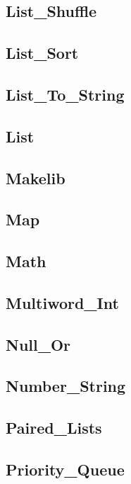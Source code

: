 \subsection{List\_Shuffle}				
\subsection{List\_Sort}					
\subsection{List\_To\_String}				
\subsection{List}					
\subsection{Makelib}                                    
\subsection{Map}					
\subsection{Math}					
\subsection{Multiword\_Int}				
\subsection{Null\_Or}                                   
\subsection{Number\_String}				
\subsection{Paired\_Lists}				
\subsection{Priority\_Queue}				
